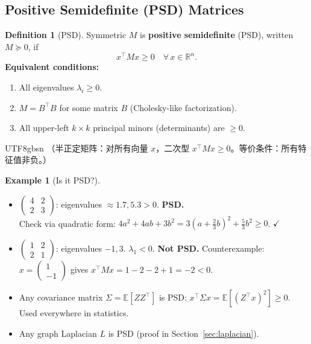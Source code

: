 \documentclass[12pt]{article}
\theoremstyle{definition}
\newtheorem{definition}[theorem]{Definition}
\newtheorem{example}[theorem]{Example}
\theoremstyle{remark}
\begin{document}
\subsection{Positive Semidefinite (PSD) Matrices}

\begin{definition}[PSD]
Symmetric $M$ is \textbf{positive semidefinite} (PSD), written $M \succeq 0$, if
\[
  x^\top M x \ge 0 \quad \forall\, x \in \mathbb{R}^n.
\]
\textbf{Equivalent conditions:}
\begin{enumerate}
  \item All eigenvalues $\lambda_i \ge 0$.
  \item $M = B^\top B$ for some matrix $B$ (Cholesky-like factorization).
  \item All upper-left $k \times k$ principal minors (determinants) are $\ge 0$.
\end{enumerate}
\end{definition}

\begin{CJK}{UTF8}{gbsn}
（半正定矩阵：对所有向量 $x$，二次型 $x^\top Mx \ge 0$。等价条件：所有特征值非负。）
\end{CJK}

\begin{example}[Is it PSD?]
\leavevmode
\begin{itemize}
  \item $\begin{pmatrix}4&2\\2&3\end{pmatrix}$:
        eigenvalues $\approx 1.7, 5.3 > 0$. \textbf{PSD.} \\
        Check via quadratic form: $4a^2+4ab+3b^2 = 3(a+\frac{2}{3}b)^2 + \frac{5}{3}b^2 \ge 0$. $\checkmark$

  \item $\begin{pmatrix}1&2\\2&1\end{pmatrix}$:
        eigenvalues $-1, 3$.  $\lambda_1 < 0$. \textbf{Not PSD.}
        Counterexample: $x = \begin{pmatrix}1\\-1\end{pmatrix}$ gives $x^\top M x = 1-2-2+1 = -2 < 0$.

  \item Any covariance matrix $\Sigma = \mathbb{E}[Z Z^\top]$ is PSD:
        $x^\top \Sigma x = \mathbb{E}[(Z^\top x)^2] \ge 0$. Used everywhere in statistics.

  \item Any graph Laplacian $L$ is PSD (proof in Section~\ref{sec:laplacian}).
\end{itemize}
\end{example}
\end{document}
